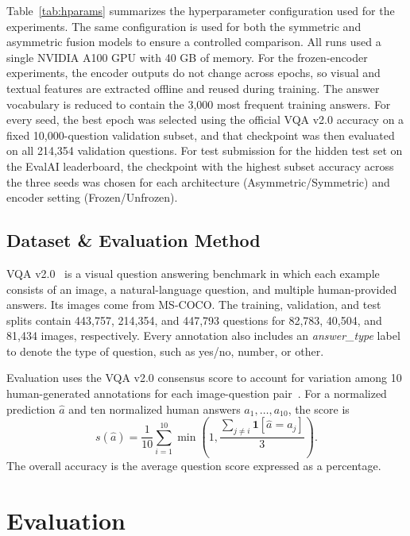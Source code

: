 \documentclass[conference]{IEEEtran}
\begin{document}
Table~\ref{tab:hparams} summarizes the hyperparameter configuration used for the experiments. The same configuration is used for both the symmetric and asymmetric fusion models to ensure a controlled comparison. All runs used a single NVIDIA A100 GPU with 40 GB of memory. For the frozen-encoder experiments, the encoder outputs do not change across epochs, so visual and textual features are extracted offline and reused during training. The answer vocabulary is reduced to contain the 3,000 most frequent training answers. For every seed, the best epoch was selected using the official VQA v2.0 accuracy on a fixed 10,000-question validation subset, and that checkpoint was then evaluated on all 214,354 validation questions. For test submission for the hidden test set on the EvalAI leaderboard, the checkpoint with the highest subset accuracy across the three seeds was chosen for each architecture (Asymmetric/Symmetric) and encoder setting (Frozen/Unfrozen).


\subsection{Dataset \& Evaluation Method}

\noindent VQA v2.0~\cite{goyal2017making} is a visual question answering benchmark in which each example consists of an image, a natural-language question, and multiple human-provided answers.  Its images come from MS-COCO. The training, validation, and test splits contain 443,757, 214,354, and 447,793 questions for 82,783, 40,504, and 81,434 images, respectively. Every annotation also includes an \textit{answer\_type} label to denote the type of question, such as yes/no, number, or other.

Evaluation uses the VQA v2.0 consensus score to account for variation among 10 human-generated annotations for each image-question pair~\cite{antol2015vqa}.  For a normalized prediction $\hat{a}$ and ten normalized human answers $a_1,\ldots,a_{10}$, the score is
\begin{equation}
s(\hat{a})=\frac{1}{10}\sum_{i=1}^{10}
\min\left(1,\frac{\sum_{j\neq i}\mathbf{1}[\hat{a}=a_j]}{3}\right).
\end{equation}
The overall accuracy is the average question score expressed as a percentage.

\section{Evaluation}
\end{document}

